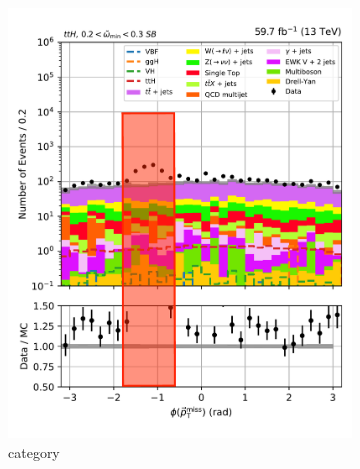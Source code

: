 \begin{figure}[htbp]
    \centering
    \begin{subfigure}[b]{0.34\textwidth}
        \includegraphics[width=\textwidth]{figures/hem_issue/sideband_4/met_phi/met_phi_ttH_before_annotated.pdf}
        \caption{\ttH category}
    \end{subfigure}
    \hspace{0.05\textwidth}
    \begin{subfigure}[b]{0.34\textwidth}

\end{subfigure}
\end{figure}
